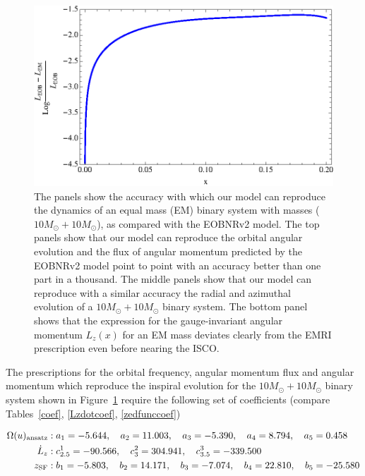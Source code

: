 \begin{figure}[ht]
\includegraphics[height=0.32\textwidth,  clip]{figures/insimri/lzinveobvcem}
\caption{The panels show the accuracy with which our model can reproduce the dynamics of an equal mass (EM) binary system with masses  ( \(10M_{\odot} + 10M_{\odot}\)), as compared with the EOBNRv2 model. The top panels show that our model can reproduce the orbital angular evolution and the flux of angular momentum predicted by the EOBNRv2 model point to point with an accuracy better than one part in a thousand. The middle panels show that our model can reproduce with a similar accuracy the radial and azimuthal evolution of a   \(10M_{\odot} + 10M_{\odot}\) binary system. The bottom panel shows that the expression for the gauge-invariant angular momentum \(L_{z}(x)\) for an EM mass deviates clearly from the EMRI prescription even before nearing the ISCO. }
\label{emcase}
\end{figure}

The prescriptions for the orbital frequency, angular momentum flux and angular momentum which reproduce the inspiral evolution for the \(10M_{\odot} + 10M_{\odot}\) binary system shown in Figure~\ref{emcase} require the following set of coefficients (compare Tables~\ref{coef}, \ref{Lzdotcoef}, \ref{zedfunccoef})


\begin{equation}
\begin{split}
\Omega(u)_{\rm ansatz} &: a_1= -5.644, \quad a_2 = 11.003, \quad a_3 = -5.390,\quad a_4 = 8.794, \quad a_5 = 0.458\\
\dot{L}_z &: c^{1}_{2.5} = -90.566, \quad c^2_3  =304.941, \quad c^3_{3.5}= -339.500\\
z_{\rm SF} &:  b_1 = -5.803,\quad  b_2= 14.171, \quad b_3 = -7.074, \quad b_4 = 22.810, \quad b_5 =-25.580
\label{ecmcoe}
\end{split}
\end{equation}

